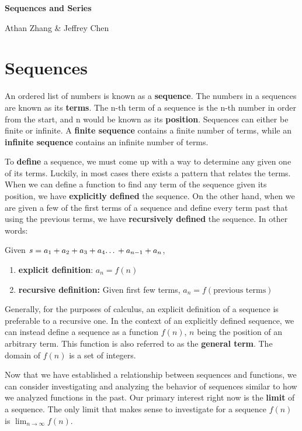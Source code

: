 \documentclass[11pt]{article}
\begin{document}
\textbf{\Huge Sequences and Series}

Athan Zhang \& Jeffrey Chen


\section{Sequences}
An ordered list of numbers is known as a \textbf{sequence}. The numbers in a sequences are known as its \textbf{terms}. The n-th term of a sequence is the n-th number in order from the start, and n would be known as its \textbf{position}. Sequences can either be finite or infinite. A \textbf{finite sequence} contains a finite number of terms, while an \textbf{infinite sequence} contains an infinite number of terms.

To \textbf{define} a sequence, we must come up with a way to determine any given one of its terms. Luckily, in most cases there exists a pattern that relates the terms.  When we can define a function to find any term of the sequence given its position, we have \textbf{explicitly defined} the sequence. On the other hand, when we are given a few of the first terms of a sequence and define every term past that using the previous terms, we have \textbf{recursively defined} the sequence. In other words:\\

\begin{center}
Given $s = a_1 + a_2 + a_3 + a_4 \text{\dots} + a_{n-1} + a_n $,
    \begin{enumerate}
    \item \textbf{explicit definition}: $a_n = f(n)$
    \item \textbf{recursive definition:} Given first few terms, $a_n = f(\text{previous terms})$
\end{enumerate}
\end{center}
\vspace{0.5 cm}

Generally, for the purposes of calculus, an explicit definition of a sequence is preferable to a recursive one. In the context of an explicitly defined sequence, we can instead define a sequence as a function $f(n)$, $n$ being the position of an arbitrary term. This function is also referred to as the \textbf{general term}. The domain of $f(n)$ is a set of integers.


Now that we have established a relationship between sequences and functions, we can consider investigating and analyzing the behavior of sequences similar to how we analyzed functions in the past. Our primary interest right now is the \textbf{limit} of a sequence. The only limit that makes sense to investigate for a sequence $f(n)$ is $\lim_{n\to \infty}f(n)$. 
\end{document}
